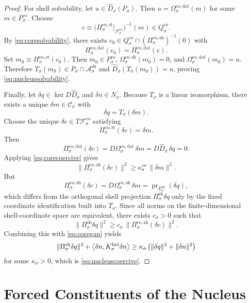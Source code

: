 \documentclass[11pt]{article}
\newcommand{\CoreState}[1]{\mathcal C_{#1}}
\newcommand{\CoreAffine}[1]{\mathcal F_{#1}^{\mathrm{co}}}
\newcommand{\CoreBody}[1]{Q_{#1}^{\mathrm{co}}}
\newcommand{\CoreStateBody}[1]{P_{#1}^{\mathrm{co}}}
\newcommand{\CoreStateProj}[1]{\Pi_{#1}^{\mathrm{co,st}}}
\newcommand{\CoreDataProj}[1]{\Pi_{#1}^{\mathrm{co,dat}}}
\newcommand{\CoreShellProj}[1]{\Pi_{#1}^{\mathrm{co,sh}}}
\newcommand{\CoreDataMap}[1]{\Omega_{#1}^{\mathrm{co,dat}}}
\newcommand{\CoreShellMap}[1]{\Omega_{#1}^{\mathrm{co,sh}}}
\newcommand{\HiddenOperator}[1]{K_{#1}^{\mathrm{hid}}}
\newcommand{\CoordBody}[1]{P_{#1}}
\newcommand{\NormalSpace}[1]{N_{#1}}
\newcommand{\AffineData}[1]{\widehat D_{#1}}
\newcommand{\ShellAffine}[1]{\mathcal A_{#1}^{\mathrm{sh}}}
\newcommand{\ShellNormal}[1]{E_{#1}^{\mathrm{sh}}}
\newcommand{\ShellProj}[1]{\Pi_{#1}^{\mathrm{sh}}}
\newcommand{\CoordIso}[1]{T_{#1}}
\begin{document}
\begin{proof}
For shell solvability, let \(u\in\AffineData{\sigma}(\CoordBody{\sigma})\). Then \(u=\CoreDataMap{\sigma}(m)\) for some \(m\in\CoreStateBody{\sigma}\). Choose
\[
c\equiv
\bigl(
\CoreStateProj{\sigma}\big|_{\CoreAffine{\sigma}}
\bigr)^{-1}(m)
\in\CoreBody{\sigma}.
\]
By \eqref{eq:coresolvability}, there exists \(c_{0}\in\CoreBody{\sigma}\cap(\CoreShellProj{\sigma})^{-1}(0)\) with
\[
\CoreDataProj{\sigma}(c_{0})=\CoreDataProj{\sigma}(c).
\]
Set \(m_{0}\equiv\CoreStateProj{\sigma}(c_{0})\). Then \(m_{0}\in\CoreStateBody{\sigma}\), \(\CoreShellMap{\sigma}(m_{0})=0\), and \(\CoreDataMap{\sigma}(m_{0})=u\). Therefore \(\CoordIso{\sigma}(m_{0})\in\CoordBody{\sigma}\cap\ShellAffine{\sigma}\) and \(\AffineData{\sigma}(\CoordIso{\sigma}(m_{0}))=u\), proving \eqref{eq:nucleussolvability}.

Finally, let \(\delta q\in\ker D\AffineData{\sigma}\) and \(\delta n\in\NormalSpace{\sigma}\). Because \(\CoordIso{\sigma}\) is a linear isomorphism, there exists a unique \(\delta m\in\CoreState{\sigma}\) with
\[
\delta q=\CoordIso{\sigma}(\delta m).
\]
Choose the unique \(\delta c\in T\CoreAffine{\sigma}\) satisfying
\[
\CoreStateProj{\sigma}(\delta c)=\delta m.
\]
Then
\[
\CoreDataProj{\sigma}(\delta c)
=
D\CoreDataMap{\sigma}\,\delta m
=
D\AffineData{\sigma}\,\delta q
=
0.
\]
Applying \eqref{eq:corecoercive} gives
\[
\bigl\|
\CoreShellProj{\sigma}(\delta c)
\bigr\|^{2}
\ge
\kappa_{\sigma}^{\mathrm{co}}\,
\|\delta m\|^{2}.
\]
But
\[
\CoreShellProj{\sigma}(\delta c)
=
D\CoreShellMap{\sigma}\,\delta m
=
\operatorname{pr}_{\ShellNormal{\sigma}}(\delta q),
\]
which differs from the orthogonal shell projection \(\ShellProj{\sigma}\delta q\) only by the fixed coordinate identification built into \(\CoordIso{\sigma}\). Since all norms on the finite-dimensional shell-coordinate space are equivalent, there exists \(c_{\sigma}>0\) such that
\[
\|\ShellProj{\sigma}\delta q\|^{2}
\ge
c_{\sigma}\,
\bigl\|
\CoreShellProj{\sigma}(\delta c)
\bigr\|^{2}.
\]
Combining this with \eqref{eq:coregap} yields
\[
\|\ShellProj{\sigma}\delta q\|^{2}
+
\ev{\delta n,\HiddenOperator{\sigma}\delta n}
\ge
\kappa_{\sigma}\,
\bigl(
\|\delta q\|^{2}+\|\delta n\|^{2}
\bigr)
\]
for some \(\kappa_{\sigma}>0\), which is \eqref{eq:nucleuscoercive}.
\end{proof}

\section{Forced Constituents of the Nucleus}
\end{document}
